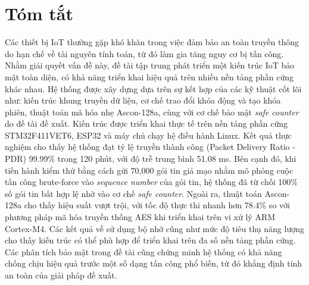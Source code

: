 \chapter*{Tóm tắt}
\label{Abstract}

Các thiết bị IoT thường gặp khó khăn trong việc đảm bảo an toàn truyền thông do hạn chế về tài nguyên tính toán, từ đó làm gia tăng nguy cơ bị tấn công. Nhằm giải quyết vấn đề này, đề tài tập trung phát triển một kiến trúc IoT bảo mật toàn diện, có khả năng triển khai hiệu quả trên nhiều nền tảng phần cứng khác nhau.
Hệ thống được xây dựng dựa trên sự kết hợp của các kỹ thuật cốt lõi như: kiến trúc khung truyền dữ liệu, cơ chế trao đổi khóa động và tạo khóa phiên, thuật toán mã hóa nhẹ Ascon-128a, cùng với cơ chế bảo mật \textit{safe counter} do đề tài đề xuất. Kiến trúc được triển khai thực tế trên nền tảng phần cứng STM32F411VET6, ESP32 và máy chủ chạy hệ điều hành Linux.
Kết quả thực nghiệm cho thấy hệ thống đạt tỷ lệ truyền thành công (Packet Delivery Ratio - PDR) 99.99\% trong 120 phút, với độ trễ trung bình 51.08 ms. Bên cạnh đó, khi tiến hành kiểm thử bằng cách gửi 70,000 gói tin giả mạo nhằm mô phỏng cuộc tấn công brute-force vào \textit{sequence number} của gói tin, hệ thống đã từ chối 100\% số gói tin bất hợp lệ nhờ vào cơ chế \textit{safe counter}. Ngoài ra, thuật toán Ascon-128a cho thấy hiệu suất vượt trội, với tốc độ thực thi nhanh hơn 78.4\% so với phương pháp mã hóa truyền thống AES khi triển khai trên vi xử lý ARM Cortex-M4.
Các kết quả về sử dụng bộ nhớ cũng như mức độ tiêu thụ năng lượng cho thấy kiến trúc có thể phù hợp để triển khai trên đa số nền tảng phần cứng. 
Các phân tích bảo mật trong đề tài cũng chứng minh hệ thống có khả năng chống chịu hiệu quả trước một số dạng tấn công phổ biến, từ đó khẳng định tính an toàn của giải pháp đề xuất.